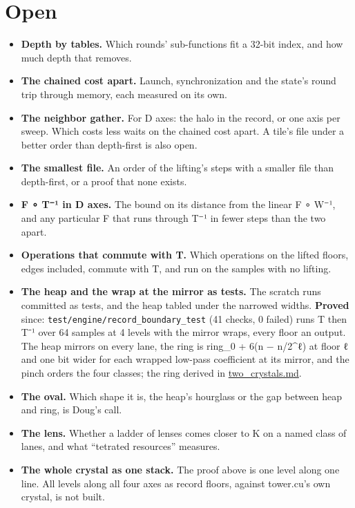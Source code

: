 \section{\texorpdfstring{Open}{Open}}

\begin{itemize}
\item \textbf{Depth by tables.} Which rounds' sub-functions fit a 32-bit index, and how much depth that removes.
\item \textbf{The chained cost apart.} Launch, synchronization and the state's round trip through memory, each measured on its own.
\item \textbf{The neighbor gather.} For D axes: the halo in the record, or one axis per sweep. Which costs less waits on the chained cost apart. A tile's file under a better order than depth-first is also open.
\item \textbf{The smallest file.} An order of the lifting's steps with a smaller file than depth-first, or a proof that none exists.
\item \textbf{F ∘ T⁻¹ in D axes.} The bound on its distance from the linear F ∘ W⁻¹, and any particular F that runs through T⁻¹ in fewer steps than the two apart.
\item \textbf{Operations that commute with T.} Which operations on the lifted floors, edges included, commute with T, and run on the samples with no lifting.
\item \textbf{The heap and the wrap at the mirror as tests.} The scratch runs committed as tests, and the heap tabled under the narrowed widths. \textbf{Proved} since: \texttt{test/\allowbreak{}engine/\allowbreak{}record\_\allowbreak{}boundary\_\allowbreak{}test} (41 checks, 0 failed) runs T then T⁻¹ over 64 samples at 4 levels with the mirror wraps, every floor an output. The heap mirrors on every lane, the ring is ring\_\allowbreak{}0 + 6(n − n/2\textasciicircum{}ℓ) at floor ℓ and one bit wider for each wrapped low-pass coefficient at its mirror, and the pinch orders the four classes; the ring derived in \hyperref[chap:two-crystals]{two\_\allowbreak{}crystals.md}.
\item \textbf{The oval.} Which shape it is, the heap's hourglass or the gap between heap and ring, is Doug's call.
\item \textbf{The lens.} Whether a ladder of lenses comes closer to K on a named class of lanes, and what “tetrated resources” measures.
\item \textbf{The whole crystal as one stack.} The proof above is one level along one line. All levels along all four axes as record floors, against tower.cu's own crystal, is not built.
\end{itemize}
